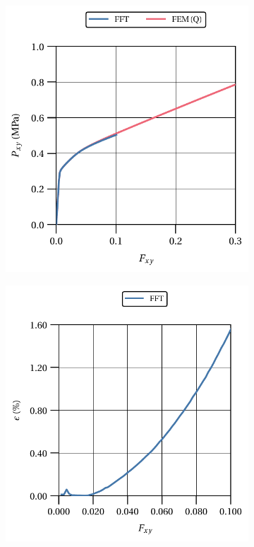 \begin{figure}[hbt]
  \centering
  	\begin{subfigure}[b]{0.49\textwidth}
      \centering
      \includegraphics[width=\textwidth]{figures/von_mises_res_mat_large_strain_2D_shear_material_response}
      \caption{}
      \label{subfig:von_mises_res_mat_large_strain_2D_shear_material_response}
    \end{subfigure}
    \begin{subfigure}[b]{0.49\textwidth}
      \centering
      \includegraphics[width=\textwidth]{figures/von_mises_res_mat_large_strain_2D_shear_material_response_error}

\end{subfigure}
\end{figure}
